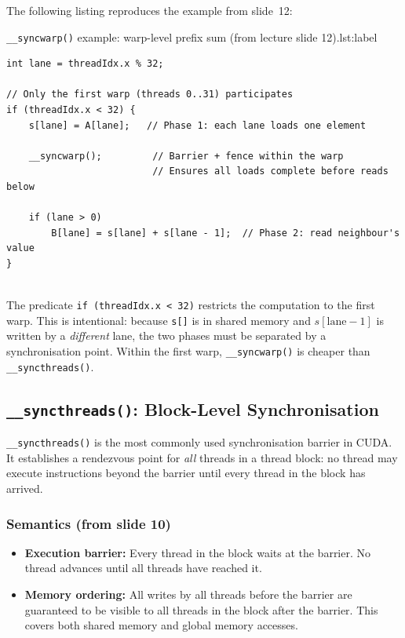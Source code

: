The following listing reproduces the example from slide~12:

\begin{ppprogram}{\texttt{\_\_syncwarp()} example: warp-level
prefix sum (from lecture slide 12).}{lst:label}
\begin{lstlisting}
int lane = threadIdx.x % 32;

// Only the first warp (threads 0..31) participates
if (threadIdx.x < 32) {
    s[lane] = A[lane];   // Phase 1: each lane loads one element

    __syncwarp();         // Barrier + fence within the warp
                          // Ensures all loads complete before reads below

    if (lane > 0)
        B[lane] = s[lane] + s[lane - 1];  // Phase 2: read neighbour's value
}
\end{lstlisting}
\end{ppprogram}

\begin{ppkey}
  \\The predicate \texttt{if (threadIdx.x < 32)} restricts the computation to
  the first warp. This is intentional: because \texttt{s[]} is in shared
  memory and $s[\text{lane} - 1]$ is written by a \emph{different} lane, the
  two phases must be separated by a synchronisation point. Within the first
  warp, \texttt{\_\_syncwarp()} is cheaper than \texttt{\_\_syncthreads()}.
\end{ppkey}

\subsection{\texttt{\_\_syncthreads()}: Block-Level Synchronisation}
\label{subsec:syncthreads}

\texttt{\_\_syncthreads()} is the most commonly used synchronisation barrier
in CUDA. It establishes a rendezvous point for \emph{all} threads in a thread
block: no thread may execute instructions beyond the barrier until every thread
in the block has arrived.

\subsubsection{Semantics (from slide 10)}

\begin{itemize}
  \item \textbf{Execution barrier:} Every thread in the block waits at the
        barrier. No thread advances until all threads have reached it.
  \item \textbf{Memory ordering:} All writes by all threads before the barrier
        are guaranteed to be visible to all threads in the block after the
        barrier. This covers both shared memory and global memory accesses.
\end{itemize}

